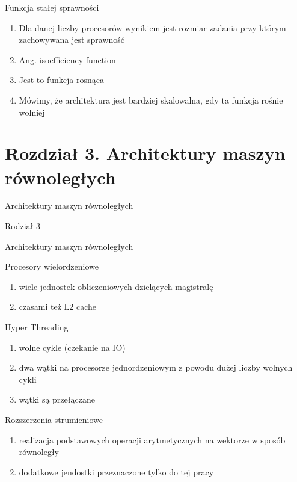 \documentclass{beamer}
\begin{document}
\begin{frame}{Funkcja stałej sprawności}
  \begin{enumerate}
  \item Dla danej liczby procesorów wynikiem jest rozmiar zadania przy którym zachowywana jest sprawność
  \item Ang. isoefficiency function
  \item Jest to funkcja rosnąca
  \item Mówimy, że architektura jest bardziej skalowalna, gdy ta funkcja rośnie wolniej
  \end{enumerate}
\end{frame}

\section{Rozdział 3. Architektury maszyn równoległych}

\begin{frame}{Architektury maszyn równoległych}
  \huge
  \begin{center}
    Rodział 3

    Architektury maszyn równoległych
  \end{center}
\end{frame}

\begin{frame}{Procesory wielordzeniowe}
  \begin{enumerate}
  \item wiele jednostek obliczeniowych dzielących magistralę
  \item czasami też L2 cache
  \end{enumerate}
\end{frame}

\begin{frame}{Hyper Threading}
  \begin{enumerate}
  \item wolne cykle (czekanie na IO)
  \item dwa wątki na procesorze jednordzeniowym z powodu dużej liczby wolnych cykli
  \item wątki są przełączane
  \end{enumerate}
\end{frame}

\begin{frame}{Rozszerzenia strumieniowe}
  \begin{enumerate}
  \item realizacja podstawowych operacji arytmetycznych na wektorze w sposób równoległy
  \item dodatkowe jendostki przeznaczone tylko do tej pracy
  \end{enumerate}
\end{frame}
\end{document}
